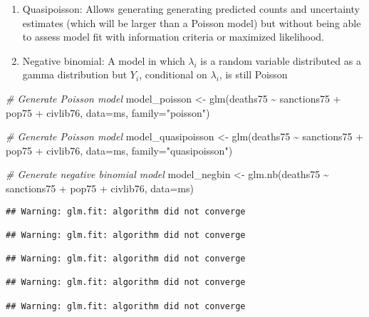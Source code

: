 \documentclass[
]{article}
\newenvironment{Shaded}{\begin{snugshade}}{\end{snugshade}}
\newcommand{\AttributeTok}[1]{\textcolor[rgb]{0.77,0.63,0.00}{#1}}
\newcommand{\CommentTok}[1]{\textcolor[rgb]{0.56,0.35,0.01}{\textit{#1}}}
\newcommand{\FunctionTok}[1]{\textcolor[rgb]{0.00,0.00,0.00}{#1}}
\newcommand{\NormalTok}[1]{#1}
\newcommand{\OtherTok}[1]{\textcolor[rgb]{0.56,0.35,0.01}{#1}}
\newcommand{\SpecialCharTok}[1]{\textcolor[rgb]{0.00,0.00,0.00}{#1}}
\newcommand{\StringTok}[1]{\textcolor[rgb]{0.31,0.60,0.02}{#1}}
\begin{document}
\begin{enumerate}
\def\labelenumi{\arabic{enumi}.}
\item
  Quasipoisson: Allows generating generating predicted counts and
  uncertainty estimates (which will be larger than a Poisson model) but
  without being able to assess model fit with information criteria or
  maximized likelihood.
\item
  Negative binomial: A model in which \(\lambda_i\) is a random variable
  distributed as a gamma distribution but \(Y_i\), conditional on
  \(\lambda_i\), is still Poisson
\end{enumerate}

\begin{Shaded}
\begin{Highlighting}[]
\CommentTok{\# Generate Poisson model}
\NormalTok{model\_poisson }\OtherTok{\textless{}{-}} \FunctionTok{glm}\NormalTok{(deaths75 }\SpecialCharTok{\textasciitilde{}}\NormalTok{ sanctions75 }\SpecialCharTok{+}\NormalTok{ pop75 }\SpecialCharTok{+}\NormalTok{ civlib76, }\AttributeTok{data=}\NormalTok{ms,}
                     \AttributeTok{family=}\StringTok{"poisson"}\NormalTok{)}

\CommentTok{\# Generate Poisson model}
\NormalTok{model\_quasipoisson }\OtherTok{\textless{}{-}} \FunctionTok{glm}\NormalTok{(deaths75 }\SpecialCharTok{\textasciitilde{}}\NormalTok{ sanctions75 }\SpecialCharTok{+}\NormalTok{ pop75 }\SpecialCharTok{+}\NormalTok{ civlib76, }\AttributeTok{data=}\NormalTok{ms,}
                     \AttributeTok{family=}\StringTok{"quasipoisson"}\NormalTok{)}


\CommentTok{\# Generate negative binomial model}
\NormalTok{model\_negbin }\OtherTok{\textless{}{-}} \FunctionTok{glm.nb}\NormalTok{(deaths75 }\SpecialCharTok{\textasciitilde{}}\NormalTok{ sanctions75 }\SpecialCharTok{+}\NormalTok{ pop75 }\SpecialCharTok{+}\NormalTok{ civlib76, }\AttributeTok{data=}\NormalTok{ms)}
\end{Highlighting}
\end{Shaded}

\begin{verbatim}
## Warning: glm.fit: algorithm did not converge

## Warning: glm.fit: algorithm did not converge

## Warning: glm.fit: algorithm did not converge

## Warning: glm.fit: algorithm did not converge

## Warning: glm.fit: algorithm did not converge
\end{verbatim}
\end{document}

